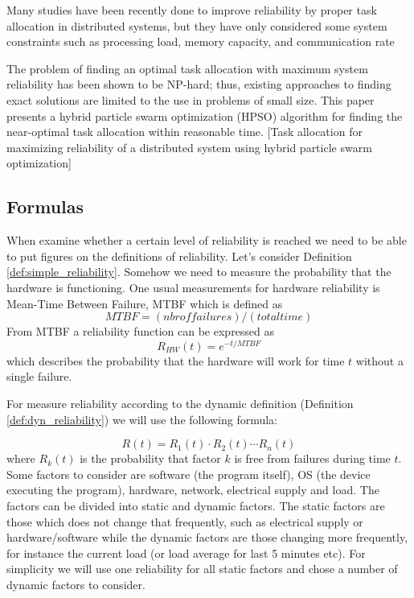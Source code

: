 \documentclass{cslthse-msc}
\begin{document}
Many studies have been recently done to improve reliability by proper task allocation in distributed systems, but they have only considered some system constraints such as processing load, memory capacity, and communication rate \cite{optTaskAllocationForMaxRel}

The problem of finding an optimal task allocation with maximum system reliability has been shown to be NP-hard; thus, existing approaches to finding exact solutions are limited to the use in problems of small size. This paper presents a hybrid particle swarm optimization (HPSO) algorithm for finding the near-optimal task allocation within reasonable time. [Task allocation for maximizing reliability of a distributed system using hybrid particle swarm optimization]



\subsection{Formulas}
When examine whether a certain level of reliability is reached we need to be able to put figures on the definitions of reliability. Let's consider Definition \ref{def:simple_reliability}. Somehow we need to measure the probability that the hardware is functioning. One usual measurements for hardware reliability is Mean-Time Between Failure, MTBF which is defined as 
\begin{equation} \label{eq:MTBF}
MTBF = (nbr  of  failures) / (total time)
\end{equation}
From MTBF a reliability function can be expressed as 
\begin{equation} \label{eq:HW_reliability}
R_{HW}(t) = e^{-t/MTBF}
\end{equation}
which describes the probability that the hardware will work for time $t$ without a single failure.

For measure reliability according to the dynamic definition (Definition \ref{def:dyn_reliability}) we will use the following formula:




\begin{equation} \label{eq:overall_reliability}
R(t) = R_{1}(t) \cdot R_{2}(t) \cdots R_{n}(t)
\end{equation}
where $R_{k}(t)$ is the probability that factor $k$ is free from failures during time $t$. Some factors to consider are software (the program itself), OS (the device executing the program), hardware, network, electrical supply and load. The factors can be divided into static and dynamic factors. The static factors are those which does not change that frequently, such as electrical supply or hardware/software while the dynamic factors are those changing more frequently, for instance the current load (or load average for last 5 minutes etc). For simplicity we will use one reliability for all static factors and chose a number of dynamic factors to consider.
\end{document}
